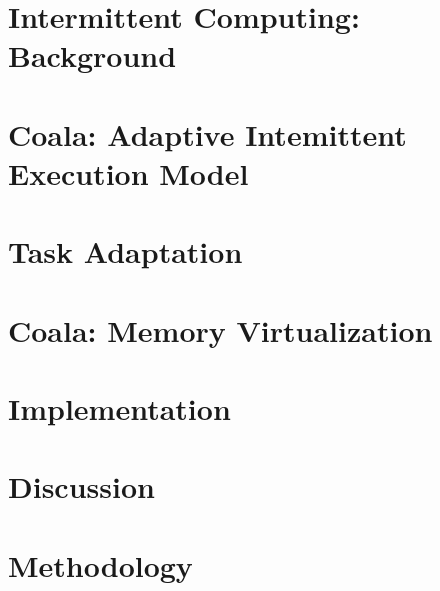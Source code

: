 \documentclass[acmsmall,review,anonymous]{acmart}\settopmatter{printfolios=true,printccs=false,printacmref=false}
\newcommand{\sys}{Coala\xspace}
\begin{document}


\section{Intermittent Computing: Background}
\label{sec:background}



\section{\sys: Adaptive Intemittent Execution Model}
\label{sec:adaptiveModel}


\section{Task Adaptation}
\label{sec:task_adaptation}

%




\section{\sys: Memory Virtualization}
\label{sec:memory_virtulaization}




%

\section{Implementation}
\label{sec:implementation}



\section{Discussion}
\label{sec:discussion}



\section{Methodology}
\label{sec:methodology}
\end{document}

